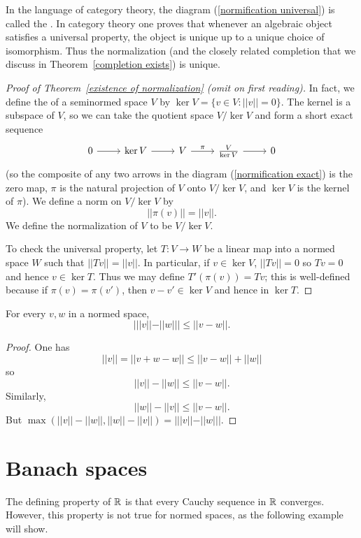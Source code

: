 \begin{subsec}
In the language of category theory, the diagram (\ref{normification universal}) is called the .
In category theory one proves that whenever an algebraic object satisfies a universal property, the object is unique up to a unique choice of isomorphism.
Thus the normalization (and the closely related completion that we discuss in Theorem~\ref{completion exists}) is unique.
\end{subsec}

\begin{proof}[Proof of Theorem~\ref{existence of normalization} (omit on first reading)]
In fact, we define the  of a seminormed space $V$ by $\ker V = \{v \in V: ||v|| = 0\}$.
The kernel is a subspace of $V$, so we can take the quotient space $V/\ker V$ and form a short exact sequence
\begin{equation}\label{normification exact}
\begin{tikzcd}
0 \arrow[r] & \ker V \arrow[r] & V \arrow[r,"\pi"] & \frac{V}{\ker V} \arrow[r] & 0
\end{tikzcd}
\end{equation}
(so the composite of any two arrows in the diagram (\ref{normification exact}) is the zero map, $\pi$ is the natural projection of $V$ onto $V/\ker V$, and $\ker V$ is the kernel of $\pi$).
We define a norm on $V/\ker V$ by
\[||\pi(v)|| = ||v||.\]
We define the normalization of $V$ to be $V/\ker V$.

To check the universal property, let $T: V \to W$ be a linear map into a normed space $W$ such that $||Tv|| = ||v||$.
In particular, if $v \in \ker V$, $||Tv|| = 0$ so $Tv = 0$ and hence $v \in \ker T$.
Thus we may define $T'(\pi(v)) = Tv$; this is well-defined because if $\pi(v) = \pi(v')$, then $v - v' \in \ker V$ and hence in $\ker T$.
\end{proof}

\begin{lemma}
For every $v, w$ in a normed space,
\[|||v|| - ||w||| \leq ||v - w||.\]
\end{lemma}
\begin{proof}
One has
\[||v|| = ||v + w - w|| \leq ||v - w|| + ||w||\]
so
\[||v|| - ||w|| \leq ||v - w||.\]
Similarly,
\[||w|| - ||v|| \leq ||v - w||.\]
But $\max(||v|| - ||w||, ||w|| - ||v||) = |||v|| - ||w|||$.
\end{proof}

\section{Banach spaces}\label{Banach space appendix}
The defining property of $\mathbb{R}$ is that every Cauchy sequence in $\mathbb{R}$ converges.
However, this property is not true for normed spaces, as the following example will show.


